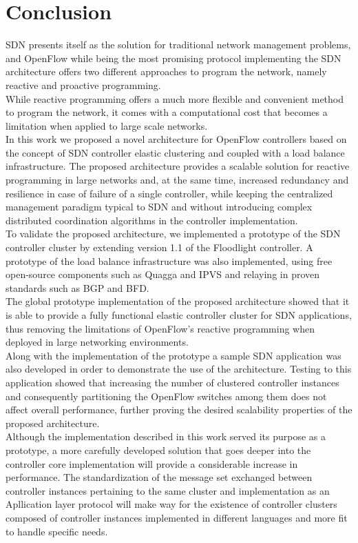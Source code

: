 
\chapter{Conclusion}
\label{chapter:conclusion}
\gls{SDN} presents itself as the solution for traditional network management problems, and OpenFlow while being the most promising protocol implementing the \gls{SDN} architecture offers two different approaches to program the network, namely reactive and proactive programming.\\
While reactive programming offers a much more flexible and convenient method to program the network, it comes with a computational cost that becomes a limitation when applied to large scale networks.\\
In this work we proposed a novel architecture for OpenFlow controllers based on the concept of SDN controller elastic clustering and coupled with a load balance infrastructure.
The proposed architecture provides a scalable solution for reactive programming in large networks and, at the same time, increased redundancy and resilience in case of failure of a single controller, while keeping the centralized management paradigm typical to \gls{SDN} and without introducing complex distributed coordination algorithms in the controller implementation.\\
To validate the proposed architecture, we implemented a prototype of the \gls{SDN} controller cluster by extending version 1.1 of the Floodlight controller.
A prototype of the load balance infrastructure was also implemented, using free open-source components such as Quagga and \gls{IPVS} and relaying in proven standards such as \gls{BGP} and \gls{BFD}.\\
%
The global prototype implementation of the proposed architecture showed that it is able to provide a fully functional elastic controller cluster for \gls{SDN} applications, thus removing the limitations of OpenFlow's reactive programming when deployed in large networking environments.\\
%
Along with the implementation of the prototype a sample \gls{SDN} application was also developed in order to demonstrate the use of the architecture.
Testing to this application showed that increasing the number of clustered controller instances and consequently partitioning the OpenFlow switches among them does not affect overall performance, further proving the desired scalability properties of the proposed architecture.\\
%
Although the implementation described in this work served its purpose as a prototype, a more carefully developed solution that goes deeper into the controller core implementation will provide a considerable increase in performance.
The standardization of the message set exchanged between controller instances pertaining to the same cluster and implementation as an Apllication layer protocol will make way for the existence of controller clusters composed of controller instances implemented in different languages and more fit to handle specific needs. 
